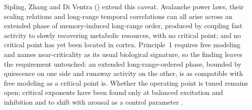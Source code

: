 \documentclass[12pt]{article}
\begin{document}
Sipling, Zhang and Di Ventra (\citeyear{Sipling2026}) extend this caveat. Avalanche power laws, their scaling relations and long-range temporal correlations can all arise across an extended phase of memory-induced long-range order, produced by coupling fast activity to slowly recovering metabolic resources, with no critical point; and no critical point has yet been located in cortex. Principle~1 requires free modeling and names near-criticality as its usual biological signature, so the finding leaves the requirement untouched: an extended long-range-ordered phase, bounded by quiescence on one side and runaway activity on the other, is as compatible with free modeling as a critical point is. Whether the operating point is tuned remains open; critical exponents have been found only at balanced excitation and inhibition \citep{Janbon2026} and to shift with arousal as a control parameter \citep{Munn2026}.
\end{document}
